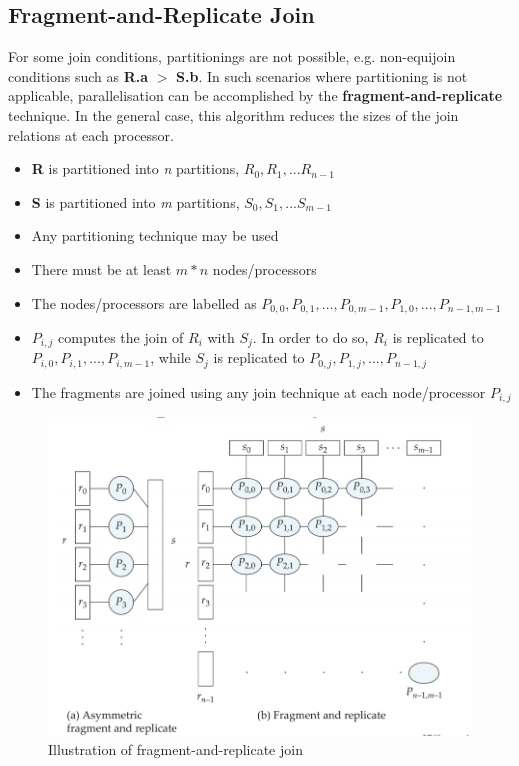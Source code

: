 \subsection{Fragment-and-Replicate Join}
For some join conditions, partitionings are not possible, e.g. non-equijoin conditions such as \textbf{R.a} $>$ \textbf{S.b}. In such scenarios where partitioning is not applicable, parallelisation can be accomplished by the \textbf{fragment-and-replicate} technique. In the general case, this algorithm reduces the sizes of the join relations at each processor. 
\begin{itemize}
    \item \textbf{R} is partitioned into \textit{n} partitions, $R_0,R_1,...R_{n-1}$
    \item \textbf{S} is partitioned into \textit{m} partitions, $S_0,S_1,...S_{m-1}$
    \item Any partitioning technique may be used
    \item There must be at least $m*n$ nodes/processors
    \item The nodes/processors are labelled as $P_{0,0},P_{0,1},...,P_{0,m-1},P_{1,0},...,P_{n-1,m-1}$
    \item $P_{i,j}$ computes the join of $R_i$ with $S_j$. In order to do so, $R_i$ is replicated to $P_{i,0},P_{i,1},...,P_{i,m-1}$, while $S_j$ is replicated to $P_{0,j},P_{1,j},...,P_{n-1,j}$
    \item The fragments are  joined using any join technique at each node/processor $P_{i,j}$
\end{itemize}

\begin{figure}[h]
  \centering
  \includegraphics[width=\linewidth]{figures/fragment-replicate-join.png}
  \caption{Illustration of fragment-and-replicate join \cite{DBLP:books/mg/SKS20, DATA3404Slides}}
  \label{fig:fragment-and-replicate-join}
\end{figure}

